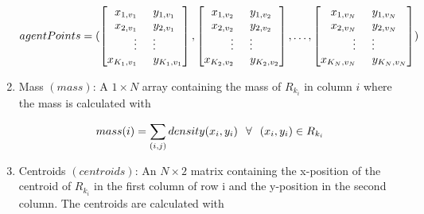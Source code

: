 \documentclass[../CourseManual.tex]{subfiles}
\begin{document}
\begin{enumerate}
  $$agentPoints = 
  (\begin{bmatrix}
    x_{1, v_{1}} \hspace{0.5cm}  y_{1, v_{1}}\\
    x_{2, v_{1}} \hspace{0.5cm}  y_{2, v_{1}}\\
    \vdots \hspace{0.5cm} \vdots \\
    x_{K_1, v_{1}} \hspace{0.5cm}  y_{K_1, v_{1}}\\
  \end{bmatrix}, 
  \begin{bmatrix}
    x_{1, v_{2}} \hspace{0.5cm}  y_{1, v_{2}}\\
    x_{2, v_{2}} \hspace{0.5cm}  y_{2, v_{2}}\\
    \vdots \hspace{0.5cm} \vdots \\
    x_{K_2, v_{2}} \hspace{0.5cm}  y_{K_2, v_{2}}\\
  \end{bmatrix}, 
  \dots, 
  \begin{bmatrix}
    x_{1, v_{N}} \hspace{0.5cm}  y_{1, v_{N}}\\
    x_{2, v_{N}} \hspace{0.5cm}  y_{2, v_{N}}\\
    \vdots \hspace{0.5cm} \vdots \\
    x_{K_N, v_{N}} \hspace{0.5cm}  y_{K_N, v_{N}}\\
  \end{bmatrix})$$
  
  
  \item Mass $(mass)$: A $1 \times N$ array containing the mass of $R_{k_{i}}$ in column $i$ where the mass is calculated with
  
  $$mass(i) = \sum_{(i,j)}density(x_i,y_i) \hspace{0.25cm} \forall \hspace{0.25cm} (x_i,y_i) \in R_{k_{i}}$$
  
  \item Centroids $(centroids)$: An $N \times 2$ matrix containing the x-position of the centroid of $R_{k_{i}}$ in the first column of row i and the y-position in the second column. The centroids are calculated with
  

\end{enumerate}
\end{document}
